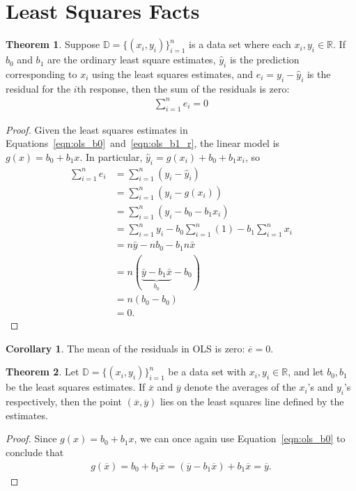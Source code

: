 \documentclass[12pt, a4paper]{article}
\theoremstyle{definition}
\newtheorem{theorem}{Theorem}
\newtheorem{corollary}{Corollary}
\begin{document}
	\section*{Least Squares Facts}
	\begin{tcolorbox}[breakable=true]
		\begin{theorem}
			\label{thm:zero-sum-residuals}
			Suppose $\mathbb{D}=\{(x_i,y_i)\}_{i=1}^{n}$ is a data set where each $x_i,y_i\in\mathbb{R}$.
			If $b_0$ and $b_1$ are the ordinary least square estimates, $\hat{y}_i$ is the prediction
			corresponding to $x_i$ using the least squares estimates, and $e_i=y_i-\hat{y}_i$ is the
			residual for the $i$th response, then the sum of the residuals is zero:
			\begin{align*}
				\sum_{i=1}^{n}e_i=0
			\end{align*}
		\end{theorem}
		\begin{proof}
			Given the least squares estimates in Equations~\ref{eqn:ols_b0}~and~\ref{eqn:ols_b1_r},
			the linear model is $g(x)=b_0+b_1x$. In particular, $\hat{y}_i=g(x_i)+b_0+b_1 x_i$,
			so
			\begin{align*}
				\sum_{i=1}^{n}e_i &= \sum_{i=1}^{n}(y_i-\hat{y}_i)\\
				&=\sum_{i=1}^{n}(y_i-g(x_i))\\
				&=\sum_{i=1}^{n}(y_i-b_0-b_1x_i)\\
				&=\sum_{i=1}^{n}y_i-b_0\sum_{i=1}^{n}(1)-b_1\sum_{i=1}^{n}x_i\\
				&=n\bar{y}-nb_0-b_1n\bar{x}\\
				&=n(\underbrace{\bar{y}-b_1\bar{x}}_{b_0}-b_0)\\
				&=n(b_0-b_0)\\
				&=0.
			\end{align*}
		\end{proof}
	\end{tcolorbox}
	\begin{tcolorbox}[breakable]
		\begin{corollary}
			\label{coroally:zero-mean-residuals}
			The mean of the residuals in OLS is zero: $\overline{e}=0$.
		\end{corollary}
	\end{tcolorbox}
	\begin{tcolorbox}[breakable]
		\begin{theorem}
			Let $\mathbb{D}=\{(x_i,y_i)\}_{i=1}^{n}$ be a data set with $x_i,y_i\in\mathbb{R}$,
			and let $b_0,b_1$ be the least squares estimates. If $\overline{x}$ and $\overline{y}$
			denote the averages of the $x_i$'s and $y_i$'s respectively, then the point
			$(\overline{x}, \overline{y})$ lies on the least squares line defined by the
			estimates.
		\end{theorem}
		\begin{proof}
			Since $g(x)=b_0 + b_1x$, we can once again use Equation~\ref{eqn:ols_b0} to conclude that
			\begin{align*}
				g(\overline{x}) = b_0 + b_1\overline{x} = (\overline{y} - b_1\overline{x}) + b_1\overline{x}
				= \overline{y}.
			\end{align*}
		\end{proof}
	\end{tcolorbox}
\end{document}

